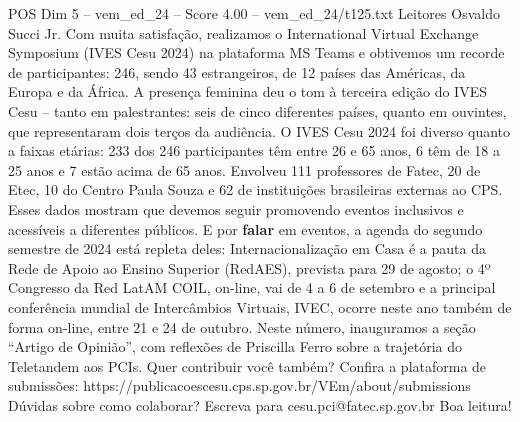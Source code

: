 \begin{textsample}{POS Dim 5 – vem\_ed\_24 – Score 4.00 – vem\_ed\_24/t125.txt}  \label{ex:f5_pos_015}
Leitores Osvaldo Succi Jr.
Com muita satisfação, realizamos o International Virtual Exchange Symposium (IVES Cesu 2024) na plataforma MS Teams e obtivemos um recorde de participantes: 246, sendo 43 estrangeiros, de 12 países das Américas, da Europa e da África.
A presença feminina deu o tom à terceira edição do IVES Cesu – tanto em palestrantes: seis de cinco diferentes países, quanto em ouvintes, que representaram dois terços da audiência.
O IVES Cesu 2024 foi diverso quanto a faixas etárias: 233 dos 246 participantes têm entre 26 e 65 anos, 6 têm de 18 a 25 anos e 7 estão acima de 65 anos.
Envolveu 111 professores de Fatec, 20 de Etec, 10 do Centro Paula Souza e 62 de instituições brasileiras externas ao CPS.
Esses dados mostram que devemos seguir promovendo eventos inclusivos e acessíveis a diferentes públicos.
E por \textbf{falar} em eventos, a agenda do segundo semestre de 2024 está repleta deles: Internacionalização em Casa é a pauta da Rede de Apoio ao Ensino Superior (RedAES), prevista para 29 de agosto; o 4º Congresso da Red LatAM COIL, on-line, vai de 4 a 6 de setembro e a principal conferência mundial de Intercâmbios Virtuais, IVEC, ocorre neste ano também de forma on-line, entre 21 e 24 de outubro.
Neste número, inauguramos a seção “Artigo de Opinião”, com reflexões de Priscilla Ferro sobre a trajetória do Teletandem aos PCIs.
Quer contribuir você também?
Confira a plataforma de submissões: https://publicacoescesu.cps.sp.gov.br/VEm/about/submissions Dúvidas sobre como colaborar?
Escreva para cesu.pci@fatec.sp.gov.br Boa leitura!

\end{textsample}
